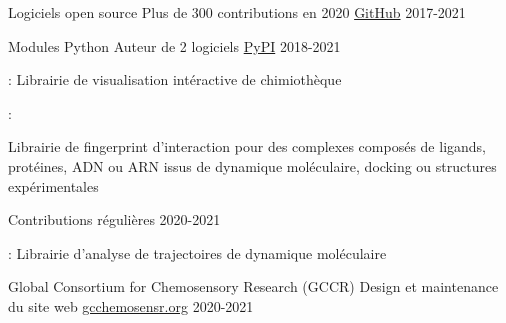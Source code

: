 
\begin{cventries}

  \cventry
    {Logiciels open source}
    {Plus de 300 contributions en 2020}
    {\href{https://github.com/cbouy/}{GitHub}}
    {2017-2021}
    {}

  \cventry
    {Modules Python}
    {Auteur de 2 logiciels}
    {\href{https://pypi.org/user/cbouy/}{PyPI}}
    {2018-2021}
    {
      \begin{cvitems}
        \item{: Librairie de visualisation intéractive de chimiothèque}
        \item{: \parbox[t]{.7\textwidth}{Librairie de fingerprint d'interaction pour des complexes composés de ligands, protéines, ADN ou ARN issus de dynamique moléculaire, docking ou structures expérimentales}}
      \end{cvitems}
    }
  
  \vspace{.4em}
  \cventry
    {}
    {Contributions régulières}
    {}
    {2020-2021}
    {
      \begin{cvitems}
        \item{: Librairie d'analyse de trajectoires de dynamique moléculaire}
      \end{cvitems}
    }

  \cventry
    {Global Consortium for Chemosensory Research (GCCR)}
    {Design et maintenance du site web}
    {\href{https://gcchemosensr.org/}{gcchemosensr.org}}
    {2020-2021}
    {}

\end{cventries}

